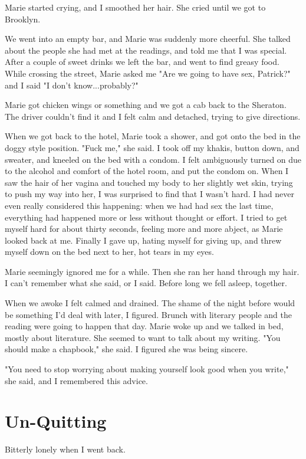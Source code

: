 \documentclass[12pt]{article}
\begin{document}
Marie started crying, and I smoothed her hair.  She cried until we got to
Brooklyn.

We went into an empty bar, and Marie was suddenly more cheerful.  She talked
about the people she had met at the readings, and told me that I was special.
After a couple of sweet drinks we left the bar, and went to find greasy food.
While crossing the street, Marie asked me "Are we going to have sex, Patrick?"
and I said "I don't know...probably?"  

Marie got chicken wings or something and we got a cab back to the Sheraton.  The
driver couldn't find it and I felt calm and detached, trying to give directions.  

When we got back to the hotel, Marie took a shower, and got onto the bed in the
doggy style position.  "Fuck me," she said.  I took off my khakis, button down,
and sweater, and kneeled on the bed with a condom.  I felt ambiguously turned on
due to the alcohol and comfort of the hotel room, and put the condom on.  When I
saw the hair of her vagina and touched my body to her slightly wet skin, trying
to push my way into her, I was surprised to find that I wasn't hard.  I had
never even really considered this happening: when we had had sex the last time,
everything had happened more or less without thought or effort.  I tried to get
myself hard for about thirty seconds, feeling more and more abject, as Marie
looked back at me.  Finally I gave up, hating myself for giving up, and threw
myself down on the bed next to her, hot tears in my eyes.

Marie seemingly ignored me for a while. Then she ran her hand through my hair.
I can't remember what she said, or I said.  Before long we fell asleep,
together.

When we awoke I felt calmed and drained.  The shame of the night before would be
something I'd deal with later, I figured.  Brunch with literary people and the
reading were going to happen that day.  Marie woke up and we talked in bed,
mostly about literature.  She seemed to want to talk about my writing.  "You
should make a chapbook," she said.  I figured she was being sincere.  

"You need to stop worrying about making yourself look good when you write," she
said, and I remembered this advice.

\section{Un-Quitting}
Bitterly lonely when I went back.
\end{document}

